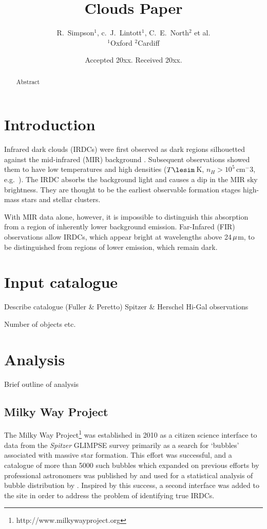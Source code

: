 \documentclass[a4,useAMS,usenatbib]{mn2e}
\title{Clouds Paper}
\author[The world]{R.~Simpson$^1$, c.~J.~Lintott$^1$, C.~E.~North$^2$ et al.
\\
$^1$Oxford
$^2$Cardiff
}
\def\mic{$\umu$m}
\begin{document}
\date{Accepted 20xx. Received 20xx.}

\pagerange{\pageref{firstpage}--\pageref{lastpage}} 

\maketitle

\label{firstpage}

\begin{abstract}
Abstract
\end{abstract}

\section{Introduction}
Infrared dark clouds (IRDCs) were first observed as dark regions
silhouetted against the mid-infrared (MIR) background
\citep{Wilcock2011}. Subsequent observations showed them to have low
temperatures and high densities ($T\lesim$\,K, $n_H > 10^5$\,cm$^-3$,
e.g.~\citet{Egan98,Carey98,HennebellePerault02}). The IRDC absorbs the
background light and causes a dip in the MIR sky brightness. They are
thought to be the earliest observable formation stages high-mass stars
and stellar clusters.

With MIR data alone, however, it is impossible to distinguish this
absorption from a region of inherently lower background
emission. Far-Infared (FIR) observations allow IRDCs, which appear
bright at wavelengths above 24\,\mic, to be distinguished from regions
of lower emission, which remain dark.


\section{Input catalogue}
Describe catalogue (Fuller \& Peretto)
Spitzer \& Herschel Hi-Gal observations

Number of objects etc.

\section{Analysis}
Brief outline of analysis

\subsection{Milky Way Project}
The Milky Way Project\footnote{http://www.milkywayproject.org} was established in 2010 as a citizen science interface to data from the \emph{Spitzer} GLIMPSE survey primarily as a search for `bubbles' associated with massive star formation. This effort was successful, and a catalogue of more than 5000 such bubbles which expanded on previous efforts by professional astronomers was published by \citet{Simpsonetal} and used for a statistical analysis of bubble distribution by \citet{Kendrewetal}. Inspired by this success, a second interface was added to the site in order to address the problem of identifying true IRDCs.
\end{document}
